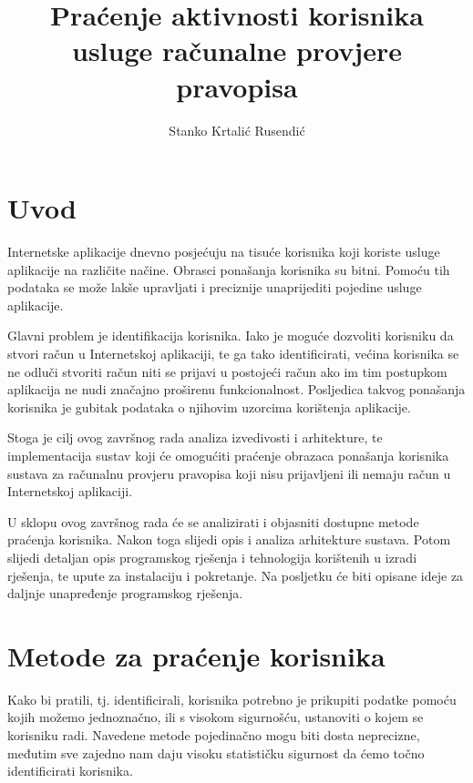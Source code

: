 \documentclass[times, utf8, zavrsni]{fer}
\begin{document}

\title{Praćenje aktivnosti korisnika usluge računalne provjere pravopisa}

\author{Stanko Krtalić Rusendić}

\maketitle


\zahvala{}

\tableofcontents

\chapter{Uvod}
Internetske aplikacije dnevno posjećuju na tisuće korisnika koji koriste
usluge aplikacije na različite načine. Obrasci ponašanja korisnika su bitni.
Pomoću tih podataka se može lakše upravljati i preciznije unaprijediti pojedine
usluge aplikacije.

Glavni problem je identifikacija korisnika. Iako je moguće dozvoliti korisniku
da stvori račun u Internetskoj aplikaciji, te ga tako identificirati, većina
korisnika se ne odluči stvoriti račun niti se prijavi u postojeći račun ako im
tim postupkom aplikacija ne nudi značajno proširenu funkcionalnost. Posljedica
takvog ponašanja korisnika je gubitak podataka o njihovim uzorcima korištenja
aplikacije.

Stoga je cilj ovog završnog rada analiza izvedivosti i arhitekture, te
implementacija sustav koji će omogućiti praćenje obrazaca ponašanja korisnika
sustava za računalnu provjeru pravopisa koji nisu prijavljeni ili nemaju račun u
Internetskoj aplikaciji.

U sklopu ovog završnog rada će se analizirati i objasniti dostupne metode
praćenja korisnika. Nakon toga slijedi opis i analiza arhitekture sustava.
Potom slijedi detaljan opis programskog rješenja i tehnologija korištenih u
izradi rješenja, te upute za instalaciju i pokretanje. Na posljetku će biti
opisane ideje za daljnje unapređenje programskog rješenja.

\chapter{Metode za praćenje korisnika}
Kako bi pratili, tj. identificirali, korisnika potrebno je prikupiti podatke
pomoću kojih možemo jednoznačno, ili s visokom sigurnošću, ustanoviti o kojem
se korisniku radi. Navedene metode pojedinačno mogu biti dosta neprecizne,
međutim sve zajedno nam daju visoku statističku sigurnost da ćemo točno
identificirati korisnika.
\end{document}
